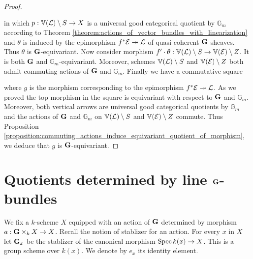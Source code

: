 \begin{proof}
\begin{center}
\end{center}
in which $p:\mathbb{V}({\mathcal L})\setminus S\rightarrow X$ is a universal good categorical quotient by $\mathbb{G}_m$ according to Theorem \ref{theorem:actions_of_vector_bundles_with_linearization} and $\theta$ is induced by the epimorphism $f^*{\mathcal E} \twoheadrightarrow {\mathcal L}$ of quasi-coherent $\mathbf{G}$-sheaves. Thus $\theta$ is $\mathbf{G}$-equivariant. Now consider morphism $f'\cdot \theta:\mathbb{V}({\mathcal L})\setminus S \rightarrow \mathbb{V}({\mathcal E})\setminus Z$. It is both $\mathbf{G}$ and $\mathbb{G}_m$-equivariant. Moreover, schemes $\mathbb{V}({\mathcal L})\setminus S$ and $\mathbb{V}({\mathcal E})\setminus Z$ both admit commuting actions of $\mathbf{G}$ and $\mathbb{G}_m$. Finally we have a commutative square
\begin{center}
\end{center}
where $g$ is the morphism corresponding to the epimorphism $f^*{\mathcal E}\twoheadrightarrow {\mathcal L}$. As we proved the top morphism in the square is equivariant with respect to $\mathbf{G}$ and $\mathbb{G}_m$. Moreover, both vertical arrows are universal good categorical quotients by $\mathbb{G}_m$ and the actions of $\mathbf{G}$ and $\mathbb{G}_m$ on $\mathbb{V}({\mathcal L})\setminus S$ and $\mathbb{V}({\mathcal E})\setminus Z$ commute. Thus Proposition \ref{proposition:commuting_actions_induce_equivariant_quotient_of_morphism}, we deduce that $g$ is $\mathbf{G}$-equivariant.
\end{proof}

\section{Quotients determined by line $\mathbf{G}$-bundles}
\noindent
We fix a $k$-scheme $X$ equipped with an action of $\mathbf{G}$ determined by morphism $a:\mathbf{G}\times_kX\rightarrow X$. Recall {\cite[Definition 5.2]{Algebraic_groups}} the notion of stablizer for an action. For every $x$ in $X$ let $\mathbf{G}_x$ be the stablizer of the canonical morphism $\mathrm{Spec}\, k(x)\rightarrow X$. This is a group scheme over $k(x)$. We denote by $e_x$ its identity element. 

